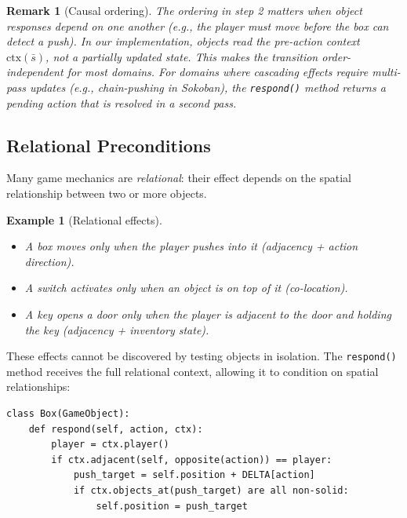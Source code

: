 \documentclass{article}
\newtheorem{remark}{Remark}
\newtheorem{example}{Example}
\begin{document}
\begin{remark}[Causal ordering]
\label{rem:ordering}
The ordering in step 2 matters when object responses depend on one another
(e.g., the player must move before the box can detect a push).  In our
implementation, objects read the pre-action context $\text{ctx}(\bar{s})$,
not a partially updated state.  This makes the transition order-independent
for most domains.  For domains where cascading effects require multi-pass
updates (e.g., chain-pushing in Sokoban), the \texttt{respond()} method
returns a \emph{pending action} that is resolved in a second pass.
\end{remark}

\subsection{Relational Preconditions}
\label{sec:relational}

Many game mechanics are \emph{relational}: their effect depends on the spatial
relationship between two or more objects.

\begin{example}[Relational effects]
\label{ex:relational}
\begin{itemize}[nosep]
    \item A box moves only when the player pushes into it (\emph{adjacency} +
          \emph{action direction}).
    \item A switch activates only when an object is on top of it
          (\emph{co-location}).
    \item A key opens a door only when the player is adjacent to the door
          \emph{and} holding the key (\emph{adjacency} + \emph{inventory state}).
\end{itemize}
\end{example}

These effects cannot be discovered by testing objects in isolation.  The
\texttt{respond()} method receives the full relational context, allowing it
to condition on spatial relationships:

\begin{verbatim}
class Box(GameObject):
    def respond(self, action, ctx):
        player = ctx.player()
        if ctx.adjacent(self, opposite(action)) == player:
            push_target = self.position + DELTA[action]
            if ctx.objects_at(push_target) are all non-solid:
                self.position = push_target
\end{verbatim}
\end{document}
